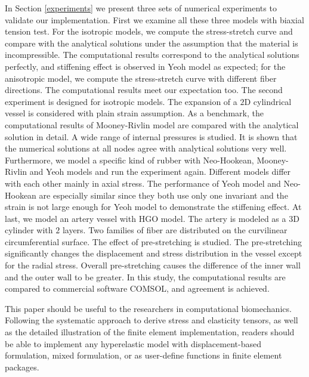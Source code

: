 In Section \ref{experiments} we present three sets of numerical experiments to validate our implementation. First we examine all these three models with biaxial tension test. For the isotropic models, we compute the stress-stretch curve and compare with the analytical solutions under the assumption that the material is incompressible. The computational results correspond to the analytical solutions perfectly, and stiffening effect is observed in Yeoh model as expected; for the anisotropic model, we compute the stress-stretch curve with different fiber directions. The computational results meet our expectation too. The second experiment is designed for isotropic models. The expansion of a $2$D cylindrical vessel is considered with plain strain assumption. As a benchmark, the computational results of Mooney-Rivlin model are compared with the analytical solution in detail. A wide range of internal pressures is studied. It is shown that the numerical solutions at all nodes agree with analytical solutions very well. Furthermore, we model a specific kind of rubber with Neo-Hookean, Mooney-Rivlin and Yeoh models and run the experiment again. Different models differ with each other mainly in axial stress. The performance of Yeoh model and Neo-Hookean are especially similar since they both use only one invariant and the strain is not large enough for Yeoh model to demonstrate the stiffening effect. At last, we model an artery vessel with HGO model. The artery is modeled as a $3$D cylinder with $2$ layers. Two families of fiber are distributed on the curvilinear circumferential surface. The effect of pre-stretching is studied. The pre-stretching significantly changes the displacement and stress distribution in the vessel except for the radial stress. Overall pre-stretching causes the difference of the inner wall and the outer wall to be greater. In this study, the computational results are compared to commercial software COMSOL, and agreement is achieved.

This paper should be useful to the researchers in computational biomechanics. Following the systematic approach to derive stress and elasticity tensors, as well as the detailed illustration of the finite element implementation, readers should be able to implement any hyperelastic model with displacement-based formulation, mixed formulation, or as user-define functions in finite element packages. 